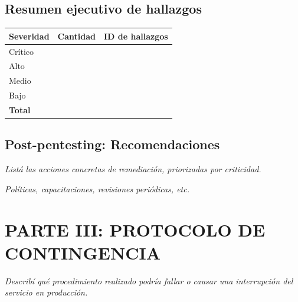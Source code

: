 \documentclass[11pt,a4paper]{article}
\begin{document}
\subsection{Resumen ejecutivo de hallazgos}

\begin{center}
\renewcommand{\arraystretch}{1.4}
\begin{tabularx}{\textwidth}{@{} p{4cm} p{3cm} X @{}}
\toprule
\textbf{Severidad} & \textbf{Cantidad} & \textbf{ID de hallazgos} \\
\midrule
\cellcolor{rojosuave} Crítico & & \\
\cellcolor{naranjasuave} Alto & & \\
\cellcolor{verdesuave} Medio & & \\
\cellcolor{azulsuave} Bajo & & \\
\midrule
\textbf{Total} & & \\
\bottomrule
\end{tabularx}
\end{center}

\subsection{Post-pentesting: Recomendaciones}

\begin{campo}
\textit{Listá las acciones concretas de remediación, priorizadas por criticidad.}
\vspace{3cm}
\end{campo}

\begin{campo}
\textit{Políticas, capacitaciones, revisiones periódicas, etc.}
\vspace{2cm}
\end{campo}

\section{PARTE III: PROTOCOLO DE CONTINGENCIA}

\begin{campo}
\textit{Describí qué procedimiento realizado podría fallar o causar una interrupción del servicio en producción.}
\vspace{2cm}
\end{campo}
\end{document}
